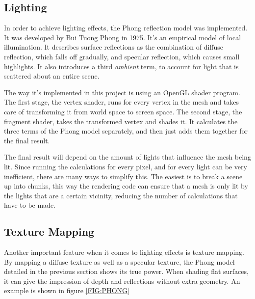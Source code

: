 
\subsection{Lighting}


In order to achieve lighting effects,
the Phong reflection model was implemented.
It was developed by Bui Tuong Phong in 1975\cite{phong}.
It's an empirical model of local illumination.
It describes surface reflections as the combination of diffuse reflection,
which falls off gradually,
and specular reflection,
which causes small highlights.
It also introduces a third \textit{ambient} term,
to account for light that is scattered about an entire scene.

The way it's implemented in this project is using an OpenGL shader program.
The first stage, the vertex shader,
runs for every vertex in the mesh and takes care of transforming it from world space to screen space.
The second stage, the fragment shader,
takes the transformed vertex and shades it.
It calculates the three terms of the Phong model separately,
and then just adds them together for the final result.

The final result will depend on the amount of lights that influence the mesh being lit.
Since running the calculations for every pixel,
and for every light can be very inefficient,
there are many ways to simplify this.
The easiest is to break a scene up into chunks,
this way the rendering code can ensure that a mesh is only lit by the lights that are a certain vicinity,
reducing the number of calculations that have to be made.

\subsection{Texture Mapping}


Another important feature when it comes to lighting effects is texture mapping.
By mapping a diffuse texture as well as a specular texture,
the Phong model detailed in the previous section shows its true power.
When shading flat surfaces,
it can give the impression of depth and reflections without extra geometry.
An example is shown in figure \ref{FIG:PHONG}

